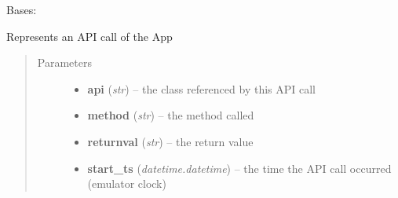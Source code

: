 \documentclass[letterpaper,10pt,english]{sphinxmanual}
\begin{document}
\begin{fulllineitems}
\label{ambrosia_plugins.apimonitor:ambrosia_plugins.apimonitor.AndroidApicallEvent}
Bases: {\hyperref[ambrosia.model:ambrosia.model.Event]{}}

Represents an API call of the App
\begin{quote}\begin{description}
\item[{Parameters}] \leavevmode\begin{itemize}
\item {} 
\textbf{api} (\emph{str}) -- the class referenced by this API call

\item {} 
\textbf{method} (\emph{str}) -- the method called

\item {} 
\textbf{returnval} (\emph{str}) -- the return value

\item {} 
\textbf{start\_ts} (\emph{datetime.datetime}) -- the time the API call occurred (emulator clock)

\end{itemize}

\end{description}\end{quote}

\begin{fulllineitems}
\label{ambrosia_plugins.apimonitor:ambrosia_plugins.apimonitor.AndroidApicallEvent.adjust_times}
\end{fulllineitems}


\begin{fulllineitems}
\label{ambrosia_plugins.apimonitor:ambrosia_plugins.apimonitor.AndroidApicallEvent.get_serializeable_properties}
\end{fulllineitems}


\begin{fulllineitems}
\label{ambrosia_plugins.apimonitor:ambrosia_plugins.apimonitor.AndroidApicallEvent.indices}
\end{fulllineitems}


\end{fulllineitems}
\end{document}
